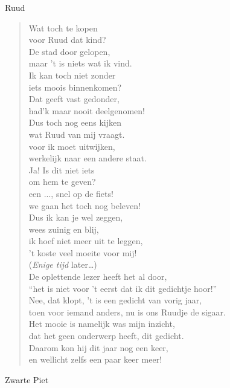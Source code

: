 \documentclass[12pt]{brief}
\date{4 december 2004}
\begin{document}
\begin{letter}{Ruud}

\opening{}


\begin{verse}

Wat toch te kopen\\
voor Ruud dat kind?\\
De stad door gelopen,\\
maar 't is niets wat ik vind.\\[0.5em]

Ik kan toch niet zonder\\
iets moois binnenkomen?\\
Dat geeft vast gedonder,\\
had'k maar nooit deelgenomen!\\[0.5em]

Dus toch nog eens kijken\\
wat Ruud van mij vraagt.\\
voor ik moet uitwijken,\\
werkelijk naar een andere staat.\\[0.5em]

Ja! Is dit niet iets\\
om hem te geven?\\
een ..., snel op de fiets!\\
we gaan het toch nog beleven!\\[0.5em]

Dus ik kan je wel zeggen,\\
wees zuinig en blij,\\
ik hoef niet meer uit te leggen,\\
't koste veel moeite voor mij!\\[2em]

(\emph{Enige tijd} later\ldots)\\[2em]

De oplettende lezer heeft het al door,\\
``het is niet voor 't eerst dat ik dit gedichtje hoor!''\\
Nee, dat klopt, 't is een gedicht van vorig jaar,\\
toen voor iemand anders, nu is ons Ruudje de sigaar.\\[0.5em]

Het mooie is namelijk was mijn inzicht,\\
dat het geen onderwerp heeft, dit gedicht.\\
Daarom kon hij dit jaar nog een keer,\\
en wellicht zelfs een paar keer meer!\\[1.2em]

\end{verse}


Zwarte Piet


\closing{}

\end{letter}
\end{document}
